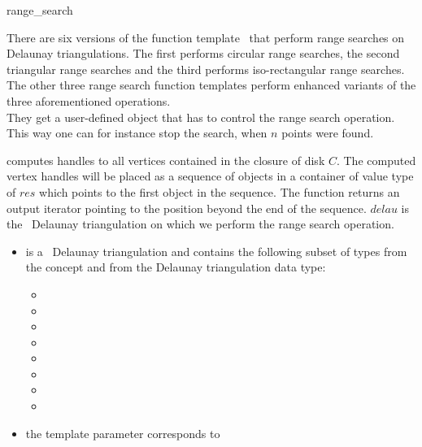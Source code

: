 \begin{ccRefFunction}{range_search}

\ccDefinition  

There are six versions of the function template \ccRefName\ that
perform range searches on Delaunay triangulations. The first performs
circular range searches, the second triangular range searches and the
third performs iso-rectangular range searches. The other three range search
function templates perform enhanced variants of the three aforementioned
operations.\\
They get a user-defined object that has to control the range search operation.
This way one can for instance stop the search, when $n$ points were found. 


{ computes handles to all vertices contained in the closure of disk $C$.
The computed vertex handles will be placed as a sequence of objects in a container of value type
of $res$
which points to the first object in the sequence. The function
returns an output iterator pointing to the position beyond the end
of the sequence.
$delau$ is the \cgal\ Delaunay triangulation on which we perform the range search operation.}

\begin{itemize}
\item {} is a \cgal\ Delaunay triangulation and contains the following subset of types from the concept  and from
the Delaunay triangulation data type:
 \begin{itemize}
  \item {} 
  \item {}
  \item {} 
  \item {}   
  \item {} 
  \item {}  
  \item {} 
  \item {} 
 \end{itemize}
\item the template parameter  corresponds to 
\end{itemize}


\end{ccRefFunction}
